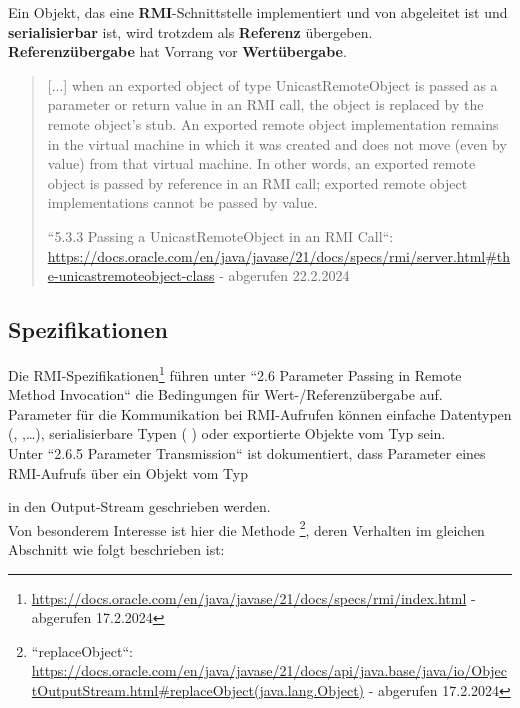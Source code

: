 \begin{tcolorbox}[enlarge top by=0.5cm,enlarge bottom by=0.5cm]
    \item Ein Objekt, das eine \textbf{RMI}-Schnittstelle implementiert und von  abgeleitet ist und \textbf{serialisierbar} ist, wird trotzdem als \textbf{Referenz} übergeben.\\

    \noindent
    \textbf{Referenzübergabe} hat Vorrang vor \textbf{Wertübergabe}.\\

    \blockquote[{``5.3.3 Passing a UnicastRemoteObject in an RMI Call``: \url{https://docs.oracle.com/en/java/javase/21/docs/specs/rmi/server.html#the-unicastremoteobject-class} - abgerufen 22.2.2024}]{
        [...] when an exported object of type UnicastRemoteObject is passed as a parameter or return value in an RMI call, the object is replaced by the remote object's stub. An exported remote object implementation remains in the virtual machine in which it was created and does not move (even by value) from that virtual machine. In other words, an exported remote object is passed by reference in an RMI call; exported remote object implementations cannot be passed by value.
    }


\end{tcolorbox}


\subsection*{Spezifikationen}

Die RMI-Spezifikationen\footnote{
\url{https://docs.oracle.com/en/java/javase/21/docs/specs/rmi/index.html} - abgerufen 17.2.2024
} führen unter ``2.6 Parameter Passing in Remote Method Invocation`` die Bedingungen für Wert-/Referenzübergabe auf.\\
Parameter für die Kommunikation bei RMI-Aufrufen können einfache Datentypen (,  ,\ldots), serialisierbare Typen ( ) oder exportierte Objekte vom Typ  sein.\\
Unter ``2.6.5 Parameter Transmission`` ist dokumentiert, dass Parameter eines RMI-Aufrufs über ein Objekt vom Typ \begin{center}\end{center} in den Output-Stream geschrieben werden.\\
Von besonderem Interesse ist hier die Methode \footnote{
   ``replaceObject``: \url{https://docs.oracle.com/en/java/javase/21/docs/api/java.base/java/io/ObjectOutputStream.html#replaceObject(java.lang.Object)} - abgerufen 17.2.2024
}, deren Verhalten im gleichen Abschnitt wie folgt beschrieben ist:

